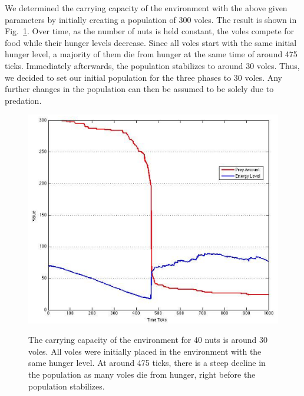 \documentclass[10pt,conference,letterpaper,doublecolumn]{IEEEtran}
\begin{document}
We determined the carrying capacity of the environment with the above given parameters by initially creating a population of 300 voles. The result is shown in Fig.~\ref{test}. Over time, as the number of nuts is held constant, the voles compete for food while their hunger levels decrease. Since all voles start with the same initial hunger level, a majority of them die from hunger at the same time of around 475 ticks. Immediately afterwards, the population stabilizes to around 30 voles. Thus, we decided to set our initial population for the three phases to 30 voles. Any further changes in the population can then be assumed to be solely due to predation.
\begin{figure}[H]
  \centering
  \includegraphics[scale=0.35]{parameter_test.png} \\
  \caption{The carrying capacity of the environment for 40 nuts is around 30 voles. All voles were initially placed in the environment with the same hunger level. At around 475 ticks, there is a steep decline in the population as many voles die from hunger, right before the population stabilizes.}
  \label{test}
\end{figure}
\end{document}
